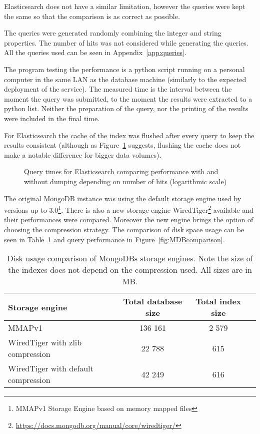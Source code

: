 Elasticsearch does not have a similar limitation, however the queries were kept
the same so that the comparison is as correct as possible.

The queries were generated randomly combining the integer and string properties. The number of hits was not 
considered while generating the queries. All the queries used can be seen in Appendix~\ref{app:queries}.

The program testing the performance is a python script running on a personal computer in the same LAN as the 
database machine (similarly to the expected deployment of the service). The measured time is the interval between 
the moment the query was submitted, to the moment the results were extracted to a python list. Neither the 
preparation of the query, nor the printing of the results were included in the final time. 

For Elasticsearch the cache of the index was flushed after every query to keep the results consistent (although as 
Figure~\ref{fig:EScache} suggests, flushing the cache does not make a notable difference for bigger data volumes). 

\begin{figure}[h]
	\centering
	
	\caption{Query times for Elasticsearch comparing performance with and without dumping depending on number of 
	hits (logarithmic scale)}
	\label{fig:EScache}
\end{figure}
\pagebreak
The original MongoDB instance was using the default storage engine used by versions up to 3.0\footnote{MMAPv1 
Storage Engine based on memory mapped files}. There is also a new storage engine WiredTiger\footnote{
\url{https://docs.mongodb.org/manual/core/wiredtiger/}} available and their performances were compared.
Moreover the new engine brings the option of choosing the compression strategy. The comparison of disk space usage 
can be seen in Table~\ref{tab:MongoComp} and query performance in Figure~\ref{fig:MDBcomparison}.

\begin{table}[t]
\centering
\begin{tabular}{lccc}
\toprule
\textbf{Storage engine}             & \textbf{Total database size} & \textbf{Total index size} \\ 
\midrule
MMAPv1                              & 136 161                      & 2 579 \\ 
WiredTiger with zlib compression    & 22 788                       & 615   \\ 
WiredTiger with default compression & 42 249                       & 616   \\ 
\toprule
\end{tabular}
\caption{Disk usage comparison of MongoDBs storage engines. Note the size of the indexes does not depend on the
compression used. All sizes are in MB.}
\label{tab:MongoComp}
\end{table}

